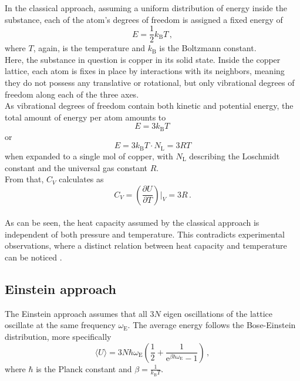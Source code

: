 In the classical approach, assuming a uniform distribution of energy inside the substance, each of the atom's degrees of freedom is assigned a fixed energy of
\begin{equation*}
    E = \frac{1}{2} k_\text{B} T \,,
\end{equation*}
where $T$, again, is the temperature and $k_\text{B}$ is the Boltzmann constant. \\

Here, the substance in question is copper in its solid state.
Inside the copper lattice, each atom is fixes in place by interactions with its neighbors, meaning they do not possess any translative or rotational, but only vibrational degrees of freedom along each of the three axes. \\
As vibrational degrees of freedom contain both kinetic and potential energy, the total amount of energy per atom amounts to
\begin{equation*}
    E = 3 k_\text{B} T \,
\end{equation*}
or
\begin{equation*}
    E = 3 k_\text{B} T \cdot N_\text{L} = 3 R T
\end{equation*}
when expanded to a single mol of copper, with $N_\text{L}$ describing the Loschmidt constant and the universal gas constant $R$.\\
From that, $C_V$ calculates as
\begin{equation*}
    C_V = \left( \frac{\partial U}{\partial T} \right) \big \vert _V = 3 R \,.
\end{equation*} \\

As can be seen, the heat capacity assumed by the classical approach is independent of both pressure and temperature.
This contradicts experimental observations, where a distinct relation between heat capacity and temperature can be noticed \cite{grossmarx}. 

\subsection{Einstein approach}

The Einstein approach assumes that all $3N$ eigen oscillations of the lattice oscillate at the same frequency $\omega_\text{E}$.
The average energy follows the Bose-Einstein distribution, more specifically
\begin{equation*}
   \langle U \rangle = 3 N \hbar \omega_\text{E} \left(\frac{1}{2} + \frac{1}{\text{e}^{\beta \hbar \omega_\text{E}} - 1} \right) \,,
\end{equation*}
where $\hbar$ is the Planck constant and $\beta = \frac{1}{k_\text{B} T}$. \\

